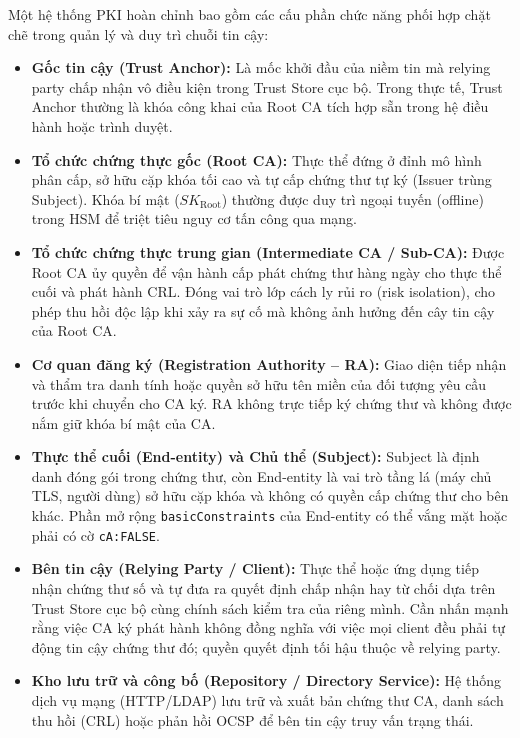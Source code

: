 Một hệ thống PKI hoàn chỉnh bao gồm các cấu phần chức năng phối hợp chặt chẽ trong quản lý và duy trì chuỗi tin cậy:
\begin{itemize}
    \item \textbf{Gốc tin cậy (Trust Anchor):} Là mốc khởi đầu của niềm tin mà relying party chấp nhận vô điều kiện trong Trust Store cục bộ. Trong thực tế, Trust Anchor thường là khóa công khai của Root CA tích hợp sẵn trong hệ điều hành hoặc trình duyệt.
    \item \textbf{Tổ chức chứng thực gốc (Root CA):} Thực thể đứng ở đỉnh mô hình phân cấp, sở hữu cặp khóa tối cao và tự cấp chứng thư tự ký (Issuer trùng Subject). Khóa bí mật ($SK_{\mathrm{Root}}$) thường được duy trì ngoại tuyến (offline) trong HSM để triệt tiêu nguy cơ tấn công qua mạng.
    \item \textbf{Tổ chức chứng thực trung gian (Intermediate CA / Sub-CA):} Được Root CA ủy quyền để vận hành cấp phát chứng thư hàng ngày cho thực thể cuối và phát hành CRL. Đóng vai trò lớp cách ly rủi ro (risk isolation), cho phép thu hồi độc lập khi xảy ra sự cố mà không ảnh hưởng đến cây tin cậy của Root CA.
    \item \textbf{Cơ quan đăng ký (Registration Authority -- RA):} Giao diện tiếp nhận và thẩm tra danh tính hoặc quyền sở hữu tên miền của đối tượng yêu cầu trước khi chuyển cho CA ký. RA không trực tiếp ký chứng thư và không được nắm giữ khóa bí mật của CA.
    \item \textbf{Thực thể cuối (End-entity) và Chủ thể (Subject):} Subject là định danh đóng gói trong chứng thư, còn End-entity là vai trò tầng lá (máy chủ TLS, người dùng) sở hữu cặp khóa và không có quyền cấp chứng thư cho bên khác. Phần mở rộng \texttt{basicConstraints} của End-entity có thể vắng mặt hoặc phải có cờ \texttt{cA:FALSE}.
    \item \textbf{Bên tin cậy (Relying Party / Client):} Thực thể hoặc ứng dụng tiếp nhận chứng thư số và tự đưa ra quyết định chấp nhận hay từ chối dựa trên Trust Store cục bộ cùng chính sách kiểm tra của riêng mình. Cần nhấn mạnh rằng việc CA ký phát hành không đồng nghĩa với việc mọi client đều phải tự động tin cậy chứng thư đó; quyền quyết định tối hậu thuộc về relying party.
    \item \textbf{Kho lưu trữ và công bố (Repository / Directory Service):} Hệ thống dịch vụ mạng (HTTP/LDAP) lưu trữ và xuất bản chứng thư CA, danh sách thu hồi (CRL) hoặc phản hồi OCSP để bên tin cậy truy vấn trạng thái.
\end{itemize}

